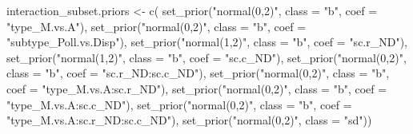 \documentclass[11pt,]{article}
\newenvironment{Shaded}{}{}
\newcommand{\KeywordTok}[1]{\textcolor[rgb]{0.00,0.00,1.00}{#1}}
\newcommand{\DataTypeTok}[1]{#1}
\newcommand{\StringTok}[1]{\textcolor[rgb]{0.00,0.50,0.50}{#1}}
\newcommand{\NormalTok}[1]{#1}
\begin{document}
\begin{Shaded}
\begin{Highlighting}[]
\NormalTok{interaction_subset.priors <-}\StringTok{ }\KeywordTok{c}\NormalTok{(}
  \KeywordTok{set_prior}\NormalTok{(}\StringTok{"normal(0,2)"}\NormalTok{, }\DataTypeTok{class =} \StringTok{"b"}\NormalTok{, }\DataTypeTok{coef =} \StringTok{"type_M.vs.A"}\NormalTok{),}
  \KeywordTok{set_prior}\NormalTok{(}\StringTok{"normal(0,2)"}\NormalTok{, }\DataTypeTok{class =} \StringTok{"b"}\NormalTok{, }\DataTypeTok{coef =} \StringTok{"subtype_Poll.vs.Disp"}\NormalTok{),}
  \KeywordTok{set_prior}\NormalTok{(}\StringTok{"normal(1,2)"}\NormalTok{, }\DataTypeTok{class =} \StringTok{"b"}\NormalTok{, }\DataTypeTok{coef =} \StringTok{"sc.r_ND"}\NormalTok{),}
  \KeywordTok{set_prior}\NormalTok{(}\StringTok{"normal(1,2)"}\NormalTok{, }\DataTypeTok{class =} \StringTok{"b"}\NormalTok{, }\DataTypeTok{coef =} \StringTok{"sc.c_ND"}\NormalTok{),}
  \KeywordTok{set_prior}\NormalTok{(}\StringTok{"normal(0,2)"}\NormalTok{, }\DataTypeTok{class =} \StringTok{"b"}\NormalTok{, }\DataTypeTok{coef =} \StringTok{"sc.r_ND:sc.c_ND"}\NormalTok{),}
  \KeywordTok{set_prior}\NormalTok{(}\StringTok{"normal(0,2)"}\NormalTok{, }\DataTypeTok{class =} \StringTok{"b"}\NormalTok{, }\DataTypeTok{coef =} \StringTok{"type_M.vs.A:sc.r_ND"}\NormalTok{),}
  \KeywordTok{set_prior}\NormalTok{(}\StringTok{"normal(0,2)"}\NormalTok{, }\DataTypeTok{class =} \StringTok{"b"}\NormalTok{, }\DataTypeTok{coef =} \StringTok{"type_M.vs.A:sc.c_ND"}\NormalTok{),}
  \KeywordTok{set_prior}\NormalTok{(}\StringTok{"normal(0,2)"}\NormalTok{, }\DataTypeTok{class =} \StringTok{"b"}\NormalTok{, }\DataTypeTok{coef =} \StringTok{"type_M.vs.A:sc.r_ND:sc.c_ND"}\NormalTok{),}
  \KeywordTok{set_prior}\NormalTok{(}\StringTok{"normal(0,2)"}\NormalTok{, }\DataTypeTok{class =} \StringTok{"sd"}\NormalTok{))}


\end{Highlighting}
\end{Shaded}
\end{document}
